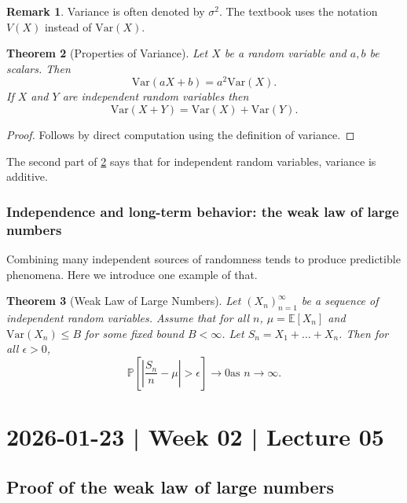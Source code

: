 \documentclass[10pt]{article}
\newtheorem{theorem}{Theorem}
\theoremstyle{definition}
\newtheorem{remark}[theorem]{Remark}
\newcommand{\1}[1]{\textbf{1}_{\left[#1\right]}} %
\def\E{\mathbb{E}} %
\def\P{\mathbb{P}} %
\def\Var{\mathrm{Var}} %
\begin{document}
\begin{remark}
  Variance is often denoted by $\sigma^{2}$. The textbook uses the notation
  $V(X)$ instead of $\Var(X)$.
\end{remark}


\begin{theorem}[Properties of Variance]
  \label{thm:variance-properties}
  Let $X$ be a random variable and $a,b$ be scalars. Then
  \begin{equation*}
    \Var(aX+b) = a^{2}\Var(X).
  \end{equation*}
  If $X$ and $Y$ are independent random variables then
 \begin{equation*}
    \Var(X+Y) = \Var(X)+\Var(Y).
  \end{equation*}
\end{theorem}
\begin{proof}
  Follows by direct computation using the definition of variance.
\end{proof}

The second part of \cref{thm:variance-properties} says that for independent
random variables, variance is additive.

\subsubsection{Independence and long-term behavior: the weak law of large numbers}

Combining many independent sources of randomness tends to produce predictible
phenomena. Here we introduce one example of that.

\begin{theorem}[Weak Law of Large Numbers]
  \label{thm:weak-law-large-numbers}
  Let $(X_{n})_{n=1}^{\infty}$ be a sequence of independent random variables.
  Assume that for all $n$, $\mu= \E\left[X_{n} \right]$ and
  $\Var(X_{n}) \leq B$ for some fixed bound $B<\infty$. Let
  $S_{n}=X_{1}+\ldots+X_{n}$. Then for all $\epsilon>0$,
  \begin{equation*}
    \P\left[ \left| \frac{S_{n}}{n}-\mu \right| >\epsilon\right] \to 0 \text{
      as } n \to \infty.
  \end{equation*}
\end{theorem}

\newpage
\section{2026-01-23 | Week 02 | Lecture 05}
\subsection{Proof of the weak law of large numbers}
\end{document}
